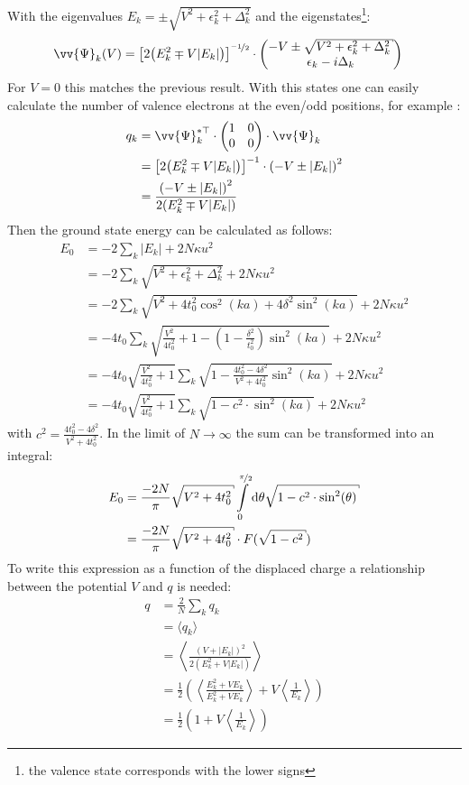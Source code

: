 With the eigenvalues $E_k = \pm \sqrt{V^2+\epsilon_k^2+\Delta_k^2}$ and the eigenstates\footnote{the valence state corresponds with the lower signs}:
\begin{align}
	\vv{\Psi}_k(V) &= \left[2\left(E_k^2\mp V|E_k|\right)\right]^{\nicefrac{-1}{2}} \cdot \begin{pmatrix*}[c]
	-V\pm \sqrt{V^2+\epsilon_k^2+\Delta_k^2}\\
	\epsilon_k - i \Delta_k
	\end{pmatrix*}
\end{align}
For $V=0$ this matches the previous result. With this states one can easily calculate the number of valence electrons at the even/odd positions, for example :
\begin{align}
	q_k &= \vv{\Psi}_k^{*\top}\cdot\begin{pmatrix*}[c]
	1 & 0\\
	0 & 0
	\end{pmatrix*}\cdot \vv{\Psi}_k\\
	&= \left[2\left(E_k^2\mp V|E_k|\right)\right]^{-1} \cdot \left(-V\pm |E_k|\right)^2\\
	&= \frac{\left(-V \pm |E_k|\right)^2}{2\left(E_k^2\mp V|E_k|\right)}
\end{align}
Then the ground state energy can be calculated as follows:
\begin{align}
	E_0 &= -2\sum_k |E_k| + 2N\kappa u^2\\
	&= -2 \sum_k \sqrt{V^2+\epsilon_k^2+\Delta_k^2}+ 2N\kappa u^2\\
	&= -2 \sum_k \sqrt{V^2 + 4t_0^2\cos^2(ka) + 4 \delta^2\sin^2(ka)}+ 2N\kappa u^2\\
	&= -4t_0 \sum_k\sqrt{\frac{V^2}{4t_0^2} + 1 - \left(1-\frac{\delta^2}{t_0^2}\right)\sin^2(ka)}+ 2N\kappa u^2\\
	&= -4t_0 \sqrt{\frac{V^2}{4t_0^2}+1}\sum_k \sqrt{1 - \frac{4t_0^2-4\delta^2}{V^2+4t_0^2} \sin^2(ka)}+ 2N\kappa u^2\\
	&= -4t_0 \sqrt{\frac{V^2}{4t_0^2}+1}\sum_k \sqrt{1 - c^2 \cdot \sin^2(ka)}+ 2N\kappa u^2
\end{align} 
with $c^2 = \frac{4t_0^2-4\delta^2}{V^2+4t_0^2}$. In the limit of $N \to \infty$ the sum can be transformed into an integral:
\begin{align}
	E_0 &= \frac{-2N}{\pi} \sqrt{V^2+4t_0^2} \int\limits_{0}^{\nicefrac{\pi}{2}} \text{d}\theta \sqrt{1 - c^2 \cdot \sin^2(\theta)}\\
	&= \frac{-2N}{\pi} \sqrt{V^2+4t_0^2} \cdot F(\sqrt{1-c^2}) 
\end{align}
To write this expression as a function of the displaced charge a relationship between the potential $V$ and $q$ is needed:
\begin{align}
	q &= \frac{2}{N} \sum_k q_k\\
	&= \langle q_k\rangle\\
	&= \left\langle\frac{\left(V + |E_k|\right)^2}{2\left(E_k^2+ V|E_k|\right)}\right\rangle\\
	&= \frac{1}{2} \left(\left\langle\frac{E_k^2+VE_k}{E_k^2+VE_k}\right\rangle + V\left\langle\frac{1}{E_k}\right\rangle\right)\\
	&= \frac{1}{2} \left(1 + V \left\langle\frac{1}{E_k}\right\rangle\right)
\end{align}
